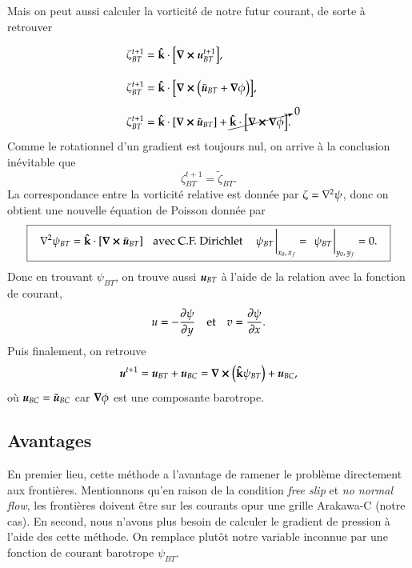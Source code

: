 \documentclass[10pt]{article}
\numberwithin{equation}{section}
\newcommand{\kvf}{\vb{\hat{k}}}
\newcommand{\uu}{\vb*{u}}
\newcommand{\bigno}{\vphantom{\qty(\frac{d}{q})}}
\newcommand{\pt}{\hspace{1pt}}
\begin{document}
Mais on peut aussi calculer la vorticité de notre futur courant, de sorte à retrouver
\begin{align}
& \zeta^{t+1}_{BT} = \kvf \cdot \qty[\curl{\uu^{t+1}_{BT}}],\bigno\nonumber\\
& \zeta^{t+1}_{BT} = \kvf \cdot \qty[\curl(\tilde{\uu}_{BT} + \gradient{\phi})],\bigno\nonumber\\
& \zeta^{t+1}_{BT} = \kvf \cdot \qty[\curl{\tilde{\uu}_{BT}}] + \cancelto{0}{\kvf\cdot\qty[\curl{\gradient{\phi}}]}.
\end{align}
Comme le rotationnel d'un gradient est toujours nul, on arrive à la conclusion inévitable que
\begin{equation}
 \zeta^{t+1}_{BT} = \tilde{\zeta}_{BT}.
\end{equation}
La correspondance entre la vorticité relative est donnée par \(\zeta = \laplacian{\psi}\), donc on obtient une nouvelle équation de Poisson donnée par
\begin{equation}
\boxed{\hspace{0.3cm}
 \laplacian{\psi_{BT}} = \kvf \cdot \qty[\curl{\tilde{\uu}_{BT}}]
 \hspace{0.31cm}\text{avec C.F. Dirichlet}\hspace{0.31cm}
 \eval{\psi_{BT}\pt}_{x_0,\pt x_f} = \ \eval{\psi_{BT}\pt}_{y_0,\pt y_f} = 0.
\hspace{0.3cm} }
\end{equation}
Donc en trouvant \(\psi_{BT}\), on trouve aussi \(\uu_{BT}\) à l'aide de la relation avec la fonction de courant,
\begin{align}
&&u = -\pdv{\psi}{y} &&\text{et} && v = \pdv{\psi}{x}.&&
\end{align}
Puis finalement, on retrouve
\begin{align}
 \uu^{t+1} = \uu_{BT} + \uu_{BC} = \curl{\qty(\kvf\psi_{BT})} + \uu_{BC},
\end{align}
où \(\uu_{BC} = \tilde{\uu}_{BC}\) car \(\gradient{\phi}\) est une composante barotrope.

\subsection{Avantages}
\label{sec:org07fd09d}
En premier lieu, cette méthode a l'avantage de ramener le problème directement aux frontières.
Mentionnons qu'en raison de la condition \emph{free slip} et \emph{no normal flow}, les frontières doivent être sur les courants opur une grille Arakawa-C (notre cas). 
En second, nous n'avons plus besoin de calculer le gradient de pression à l'aide des cette méthode.
On remplace plutôt notre variable inconnue par une fonction de courant barotrope \(\psi_{BT}\).
\end{document}
